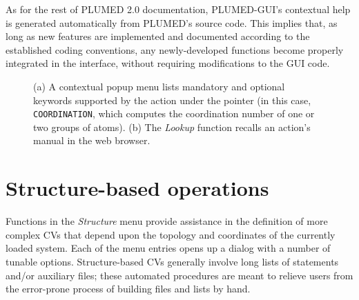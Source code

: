 \documentclass[preprint,review,11pt]{elsarticle}
\begin{document}
As for the rest of PLUMED 2.0 documentation, PLUMED-GUI's contextual
help is generated automatically from PLUMED's source code.  This
implies that, as long as new features are implemented and documented
according to the established coding conventions, any newly-developed
functions become properly integrated in the interface, without
requiring modifications to the GUI code.






\begin{figure}
  \centering
  \caption{(a) A contextual popup menu lists mandatory and
    optional keywords supported by the action under the pointer (in
    this case, \texttt{COORDINATION}, which computes the coordination
    number of one or two groups of atoms). (b) The \emph{Lookup} function
    recalls an action's manual in the web browser. }
  \label{fig:help}
\end{figure}





\section{Structure-based operations}


Functions in the \emph{Structure} menu provide assistance in the
definition of more complex CVs that depend upon the topology and coordinates of
the currently loaded system.  Each of the menu entries opens up a
dialog with a number of tunable options. Structure-based CVs
generally involve long lists of statements and/or auxiliary files;
these automated procedures are meant to relieve users from the error-prone
process of building files and lists by hand.
\end{document}
